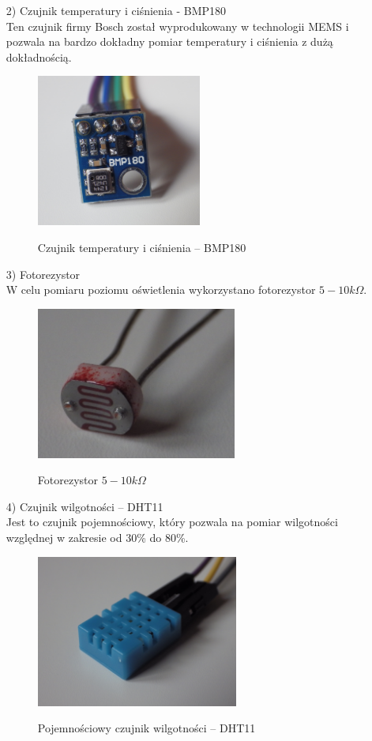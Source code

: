 \documentclass[12pt,a4paper]{article}
\begin{document}
\begin{enumerate}
\begin{enumerate}
	\end{enumerate}	
	
\newpage
	
	\item[2)]Czujnik temperatury i ciśnienia - BMP180\\
	Ten czujnik firmy Bosch został wyprodukowany w technologii MEMS i pozwala na bardzo dokładny pomiar temperatury i ciśnienia z dużą dokładnością.

\begin{figure}[!h]	
\centering
	\includegraphics[height =50mm]{BMP180.jpg}
	\label{BMP180}
	\caption{Czujnik temperatury i ciśnienia -- BMP180}
\end{figure}	
	
	\item[3)]Fotorezystor\\
	W celu pomiaru poziomu oświetlenia wykorzystano fotorezystor $5-10k\Omega$.

\begin{figure}[!h]	
\centering
	\includegraphics[height =50mm]{fotorezystor.jpg}
	\label{fotorezystor}
	\caption{Fotorezystor $5-10k\Omega$}
\end{figure}	
	
	\item[4)]Czujnik wilgotności -- DHT11\\
	Jest to czujnik pojemnościowy, który pozwala na pomiar wilgotności względnej w zakresie od 30\% do 80\%.

\begin{figure}[!h]	
\centering
	\includegraphics[height =50mm]{DHT11.jpg}
	\label{DHT11}
	\caption{Pojemnościowy czujnik wilgotności -- DHT11}
\end{figure}		
	

\end{enumerate}
\end{document}
